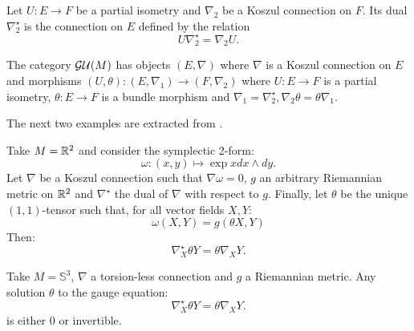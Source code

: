 \begin{defn}
\label{def:general_dual_connections}
Let $U \colon E \to F$ be a partial isometry and $\nabla_2$ be a Koszul connection on $F$. Its dual $\nabla_2^\star$ is the connection on $E$ defined by the relation
\begin{equation}
    \label{eq:general_dual_connections}
    U \nabla_2^\star = \nabla_2 U.
\end{equation}
\end{defn}
\begin{defn}
    \label{def:category_gauge_dual}
    The category $\mathcal{GU}(M)$ has objects $(E,\nabla)$ where $\nabla$ is a Koszul connection on $E$ and morphisms $(U, \theta) \colon (E, \nabla_1) \to (F, \nabla_2)$ where $U \colon E \to F$ is a partial isometry, $\theta \colon E \to F$ is a bundle morphism and $\nabla_1 = \nabla_2^\star, \nabla_2 \theta = \theta \nabla_1.$
\end{defn}
The next two examples are extracted from \cite{boyom2024}. 
\begin{ex}
    Take $M = \mathbb{R}^2$ and consider the symplectic 2-form:
    \begin{equation}
        \omega \colon (x,y) \mapsto \exp{x} dx \wedge dy.
    \end{equation}
    Let $\nabla$ be a Koszul connection such that $\nabla \omega = 0$, $g$ an arbitrary Riemannian metric on $\mathbb{R}^2$ and $\nabla^\star$ the dual of $\nabla$ with respect to $g$. Finally, let $\theta$ be the unique $(1,1)$-tensor such that, for all vector fields $X,Y$:
    \begin{equation}
        \omega(X,Y) = g(\theta X, Y)
    \end{equation}
    Then:
    \begin{equation}
        \nabla^\star_X \theta Y = \theta \nabla_X Y. 
    \end{equation}
\end{ex}
\begin{ex}
    Take $M=\mathbb{S}^3$, $\nabla$ a torsion-less connection and $g$ a Riemannian metric. Any solution $\theta$ to the gauge equation:
    \begin{equation}
        \nabla^\star_X \theta Y = \theta \nabla_X Y. 
    \end{equation}
    is either 0 or invertible.
\end{ex}

